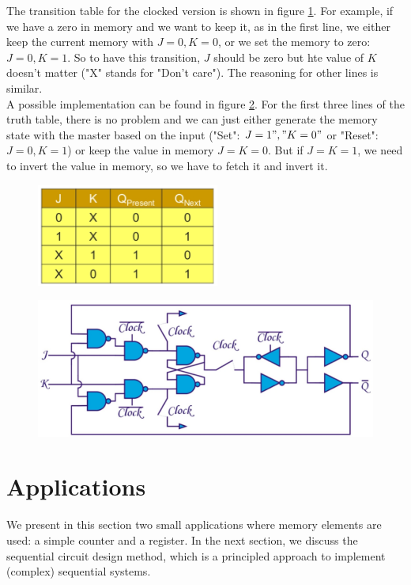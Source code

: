 The transition table for the clocked version is shown in figure \ref{fig:JK_FF3}. For example, if we have a zero in memory and we want to keep it, as in the first line, we either keep the current memory with $J=0, K=0$, or we set the memory to zero: $J=0, K=1$. So to have this transition, $J$ should be zero but hte value of $K$ doesn't matter ("X" stands for "Don't care"). The reasoning for other lines is similar.\\
A possible implementation can be found in figure \ref{fig:JK_FF4}. For the first three lines of the truth table, there is no problem and we can just either generate the memory state with the master based on the input ("Set": $J=1", "K=0"$ or "Reset": $J=0, K=1$) or keep the value in memory $J = K = 0$. But if $J=K=1$, we need to invert the value in memory, so we have to fetch it and invert it. 


\begin{figure}[h!]
	\centering
	\includegraphics[width=6cm]{figures/ch17/JK_FF3.jpg}
	\caption{}
	\label{fig:JK_FF3}
\end{figure}

\begin{figure}[h!]
	\centering
	\includegraphics[width=12cm]{figures/ch17/JK_FF4.jpg}
	\caption{}
	\label{fig:JK_FF4}
\end{figure}

\section{Applications}
We present in this section two small applications where memory elements are used: a simple counter and a register. In the next section, we discuss the sequential circuit design method, which is a principled approach to implement (complex) sequential systems.

